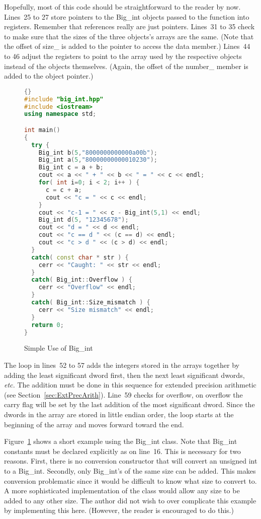 Hopefully, most of this code should be straightforward to the reader
by now. Lines~25 to 27 store pointers to the {\code Big\_int} objects
passed to the function into registers. Remember that references really
are just pointers.  Lines~31 to 35 check to make sure that the sizes
of the three objects's arrays are the same. (Note that the offset of
{\code size\_} is added to the pointer to access the data member.)
Lines~44 to 46 adjust the registers to point to the array used by the
respective objects instead of the objects themselves. (Again, the
offset of the {\code number\_} member is added to the object pointer.)

\begin{figure}[tp]
\begin{lstlisting}[language=C++, frame=tlrb]{}
#include "big_int.hpp"
#include <iostream>
using namespace std;

int main()
{
  try {
    Big_int b(5,"8000000000000a00b");
    Big_int a(5,"80000000000010230");
    Big_int c = a + b;
    cout << a << " + " << b << " = " << c << endl;
    for( int i=0; i < 2; i++ ) {
      c = c + a;
      cout << "c = " << c << endl;
    }
    cout << "c-1 = " << c - Big_int(5,1) << endl;
    Big_int d(5, "12345678");
    cout << "d = " << d << endl;
    cout << "c == d " << (c == d) << endl;
    cout << "c > d " << (c > d) << endl;
  }
  catch( const char * str ) {
    cerr << "Caught: " << str << endl;
  }
  catch( Big_int::Overflow ) {
    cerr << "Overflow" << endl;
  }
  catch( Big_int::Size_mismatch ) {
    cerr << "Size mismatch" << endl;
  }
  return 0;
}
\end{lstlisting}
\caption{ Simple Use of {\code Big\_int} \label{fig:BigIntEx}}
\end{figure}

The loop in lines~52 to 57 adds the integers stored in the arrays together
by adding the least significant dword first, then the next least significant
dwords, \emph{etc.} The addition must be done in this sequence for extended
precision arithmetic (see Section~\ref{sec:ExtPrecArith}). Line~59 checks
for overflow, on overflow the carry flag will be set by the last addition
of the most significant dword. Since the dwords in the array are stored in
little endian order, the loop starts at the beginning of the array and
moves forward toward the end.

Figure~\ref{fig:BigIntEx} shows a short example using the {\code Big\_int}
class. Note that {\code Big\_int} constants must be declared explicitly as
on line~16. This is necessary for two reasons. First, there is no conversion
constructor that will convert an unsigned int to a {\code Big\_int}. Secondly,
only {\code Big\_int}'s of the same size can be added. This makes conversion
problematic since it would be difficult to know what size to convert to. A
more sophisticated implementation of the class would allow any size to be
added to any other size. The author did not wish to over complicate this
example by implementing this here. (However, the reader is encouraged to
do this.)

